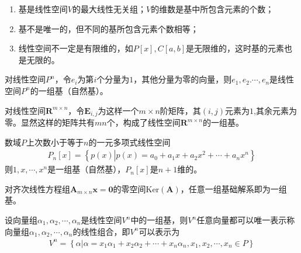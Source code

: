 \begin{remark}

    \begin{enumerate}[label=(\arabic*)]
        \item 基是线性空间$V$的最大线性无关组；$V$的维数是基中所包含元素的个数；
        \item 基不是唯一的，但不同的基所包含元素个数相等；
        \item 线性空间不一定是有限维的，如$P[x],C[a,b]$是无限维的，这时基的元素也是无限的。
    \end{enumerate}
\end{remark}

\begin{example}
    对线性空间$P^{n}$，令$e_{i}$为第$i$个分量为$1$，其他分量为零的向量，则$e_{1},e_{2}.\cdots,e_{n}$是线性空间$P^{n}$的一组基（自然基）。
\end{example}

\begin{example}
    对线性空间$\mathbf{R}^{m\times{n}}$，令$\mathbf{E}_{i,j}$为这样一个$m\times{n}$阶矩阵，其$(i,j)$元素为$1$,其余元素为零。显然这样的矩阵共有$mn$个，构成了线性空间$\mathbf{R}^{m\times{n}}$的一组基。
\end{example}

\begin{example}
    数域$P$上次数小于等于$n$的一元多项式线性空间
    \begin{eqnarray}
        P_{n}[x]=\left\{p(x)\left|p(x)=a_{0}+a_{1}x+a_{2}x^{2}+\cdots+a_{n}x^{n}\right.\right\}\nonumber
    \end{eqnarray}
    则$1,x,\cdots,x^{n}$是一组基（自然基），$P_{n}[x]$是$n+1$维的。
\end{example}

\begin{example}
    对齐次线性方程组$\mathbf{A}_{m\times{n}}\mathbf{x=0}$的零空间$\text{Ker}(\mathbf{A})$，任意一组基础解系即为一组基。
\end{example}

\begin{theorem}
    设向量组$\alpha_{1},\alpha_{2},\cdots,\alpha_{n}$是线性空间$V^{n}$中的一组基，则$V^{n}$任意向量都可以唯一表示称向量组$\alpha_{1},\alpha_{2},\cdots,\alpha_{n}$的线性组合，即$V^{n}$可以表示为
    \begin{eqnarray}
        V^{n}=\left\{\alpha\left|\alpha=x_{1}\alpha_{1}+x_{2}\alpha_{2}+\cdots+x_{n}\alpha_{n},x_{1},x_{2},\cdots,x_{n}\in{P}\right.\right\}\nonumber
    \end{eqnarray}
\end{theorem}

